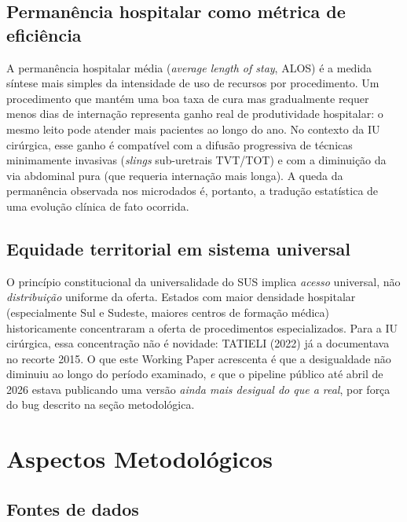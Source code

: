 \documentclass[12pt,a4paper,oneside]{article}
\begin{document}
\subsection{Permanência hospitalar como métrica de eficiência}

A permanência hospitalar média (\textit{average length of stay},
ALOS) é a medida síntese mais simples da intensidade de uso de
recursos por procedimento. Um procedimento que mantém uma boa
taxa de cura mas gradualmente requer menos dias de internação
representa ganho real de produtividade hospitalar: o mesmo leito
pode atender mais pacientes ao longo do ano. No contexto da IU
cirúrgica, esse ganho é compatível com a difusão progressiva de
técnicas minimamente invasivas (\textit{slings} sub-uretrais
TVT/TOT) e com a diminuição da via abdominal pura (que requeria
internação mais longa). A queda da permanência observada nos
microdados é, portanto, a tradução estatística de uma evolução
clínica de fato ocorrida.

\subsection{Equidade territorial em sistema universal}

O princípio constitucional da universalidade do SUS implica
\textit{acesso} universal, não \textit{distribuição} uniforme da
oferta. Estados com maior densidade hospitalar (especialmente Sul
e Sudeste, maiores centros de formação médica) historicamente
concentraram a oferta de procedimentos especializados. Para a IU
cirúrgica, essa concentração não é novidade: TATIELI (2022) já a
documentava no recorte 2015. O que este Working
Paper acrescenta é que a desigualdade não diminuiu ao longo do
período examinado,
\textit{e} que o pipeline público até abril de 2026 estava
publicando uma versão \textit{ainda mais desigual do que a real},
por força do bug descrito na seção metodológica.

\section{Aspectos Metodológicos}\label{sec:metodo}

\subsection{Fontes de dados}
\end{document}
